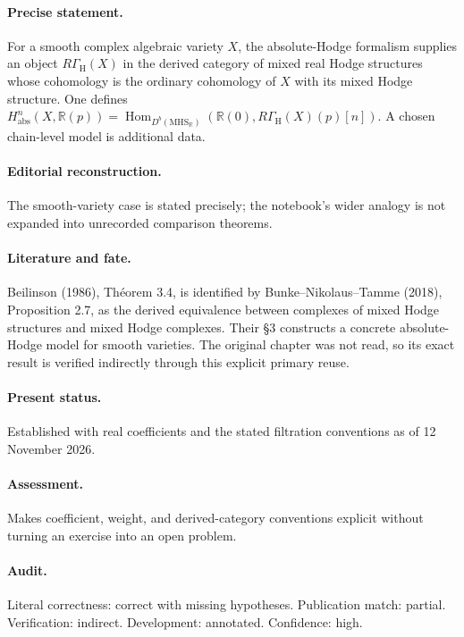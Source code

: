 \paragraph{Precise statement.} For a smooth complex algebraic variety \(X\), the absolute-Hodge formalism supplies an object \(R\Gamma_{\mathrm H}(X)\) in the derived category of mixed real Hodge structures whose cohomology is the ordinary cohomology of \(X\) with its mixed Hodge structure. One defines \(H^n_{\mathrm{abs}}(X,\mathbb R(p))=\operatorname{Hom}_{D^b(\mathrm{MHS}_{\mathbb R})}(\mathbb R(0),R\Gamma_{\mathrm H}(X)(p)[n])\). A chosen chain-level model is additional data.

\paragraph{Editorial reconstruction.} The smooth-variety case is stated precisely; the notebook’s wider analogy is not expanded into unrecorded comparison theorems.

\paragraph{Literature and fate.} Beilinson (1986), Théorem 3.4, is identified by Bunke–Nikolaus–Tamme (2018), Proposition 2.7, as the derived equivalence between complexes of mixed Hodge structures and mixed Hodge complexes. Their \S3 constructs a concrete absolute-Hodge model for smooth varieties. The original chapter was not read, so its exact result is verified indirectly through this explicit primary reuse.

\paragraph{Present status.} Established with real coefficients and the stated filtration conventions as of 12 November 2026.

\paragraph{Assessment.} Makes coefficient, weight, and derived-category conventions explicit without turning an exercise into an open problem.

\paragraph{Audit.} Literal correctness: correct with missing hypotheses. Publication match: partial. Verification: indirect. Development: annotated. Confidence: high.

